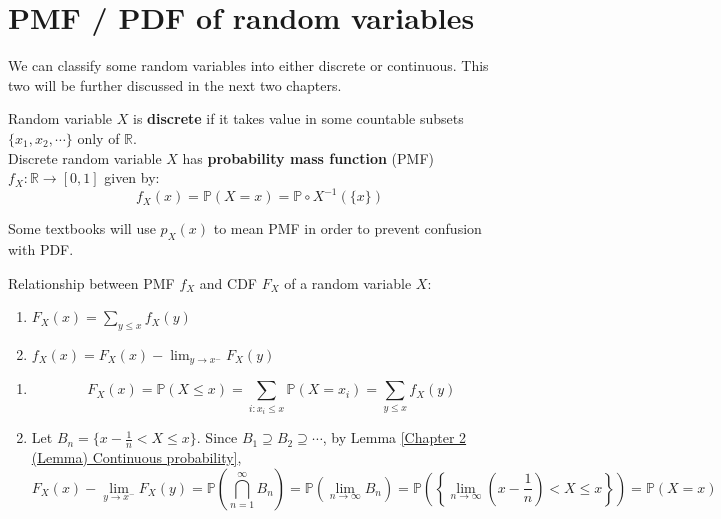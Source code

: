 \documentclass{huhtakm-template-book}
\newcommand{\prob}{\mathbb{P}}
\begin{document}
\section{PMF / PDF of random variables}
We can classify some random variables into either discrete or continuous. This two will be further discussed in the next two chapters.
\begin{defn}
	Random variable $X$ is \textbf{discrete} if it takes value in some countable subsets $\{x_{1},x_{2},\cdots\}$ only of $\mathbb{R}$.\\
	Discrete random variable $X$ has \textbf{probability mass function} (PMF) $f_{X}:\mathbb{R}\to [0,1]$ given by: 
	\begin{equation*}
		f_{X}(x)=\prob(X=x)=\prob\circ X^{-1}(\{x\})
	\end{equation*}
\end{defn}
\begin{rem}
	Some textbooks will use $p_{X}(x)$ to mean PMF in order to prevent confusion with PDF.
\end{rem}
\begin{lem}
	\label{Chapter 3 (Lemma) Relationship between pmf and cdf}
	Relationship between PMF $f_{X}$ and CDF $F_{X}$ of a random variable $X$:
	\begin{enumerate}
		\item $F_{X}(x)=\sum_{y\leq x}f_{X}(y)$
		\item $f_{X}(x)=F_{X}(x)-\lim_{y\to x^{-}}F_{X}(y)$
	\end{enumerate}
\end{lem}
\begin{proofing}
	\begin{enumerate}
		\item 
		\begin{equation*}
			F_{X}(x)=\prob(X\leq x)=\sum_{i:x_{i}\leq x}\prob(X=x_{i})=\sum_{y\leq x}f_{X}(y)
		\end{equation*}
		\item Let $B_{n}=\big\{x-\frac{1}{n}<X\leq x\big\}$. Since $B_{1}\supseteq B_{2}\supseteq\cdots$, by Lemma \ref{Chapter 2 (Lemma) Continuous probability},
		\begin{equation*}
			F_{X}(x)-\lim_{y\to x^{-}}F_{X}(y)=\prob\left(\bigcap_{n=1}^{\infty}B_{n}\right)=\prob\left(\lim_{n\to\infty}B_{n}\right)=\prob\left(\left\{\lim_{n\to\infty}\left(x-\frac{1}{n}\right)<X\leq x\right\}\right)=\prob(X=x)
		\end{equation*}
	\end{enumerate}
\end{proofing}
\end{document}

